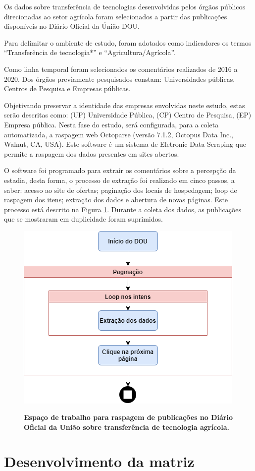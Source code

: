Os dados sobre transferência de tecnologias desenvolvidas pelos órgãos públicos direcionadas ao setor agrícola foram selecionados a partir das publicações disponíveis no Diário Oficial da Únião DOU.

Para delimitar o ambiente de estudo, foram adotados como indicadores os termos “Transferência de tecnologia*” e “Agricultura/Agrícola”. 

Como linha temporal foram selecionados os comentários realizados de 2016 a 2020. Dos órgãos previamente pesquisados  constam: Universidades públicas, Centros de Pesquisa e Empresas públicas.

Objetivando preservar a identidade das empresas envolvidas neste estudo, estas serão descritas como: (UP) Universidade Pública, (CP) Centro de Pesquisa, (EP) Empresa pública.
Nesta fase do  estudo, será configurada, para a coleta automatizada, a raspagem web Octoparse (versão 7.1.2, Octopus Data Inc., Walnut, CA, USA). Este software é um sistema de Eletronic Data Scraping que permite a raspagem dos dados presentes em sites abertos. 

O software foi programado para extrair os comentários sobre a percepção da estadia, desta forma, o processo de extração foi realizado em cinco passos, a saber: acesso ao site de ofertas; paginação dos locais de hospedagem; loop de raspagem dos itens; extração dos dados e abertura de novas páginas. Este processo está descrito na Figura \ref{figura_raspagem}. Durante a coleta dos dados, as publicações que se mostraram em duplicidade foram suprimidos. 



\begin{figure}[H]
\centering
\caption{\textbf{Espaço de trabalho para raspagem de publicações no Diário Oficial da União sobre transferência de tecnologia agrícola.
}}
\includegraphics[scale=0.6]{Imagens/raspagem.png}
\label{figura_raspagem}
\end{figure}


\section{Desenvolvimento da matriz}









